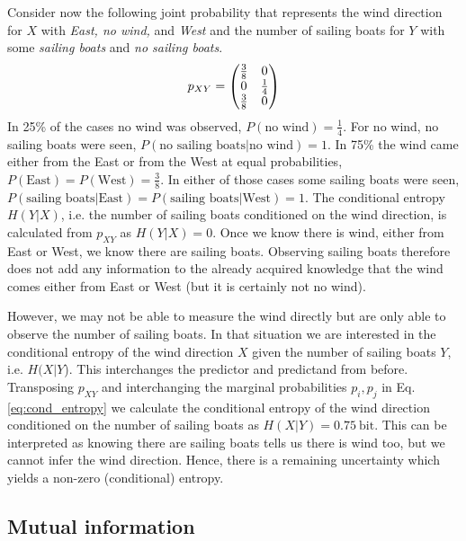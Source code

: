 Consider now the following joint probability that represents the wind direction for $X$ with \emph{East, no wind,} and \emph{West} and
the number of sailing boats for $Y$ with some \emph{sailing boats} and \emph{no sailing boats}.
\begin{equation}
	p_{XY} = \begin{pmatrix} \tfrac{3}{8} & 0 \\
				0 & \tfrac{1}{4} \\
				\tfrac{3}{8} & 0 \end{pmatrix}
\end{equation}
In 25\% of the cases no wind was observed, $P(\text{no wind}) = \tfrac{1}{4}$. For no wind, no sailing boats were seen,
$P(\text{no sailing boats} \vert \text{no wind}) = 1$. In 75\% the wind came either from the East or from the West at
equal probabilities, $P(\text{East}) = P(\text{West}) = \tfrac{3}{8}$. In either of those cases some sailing boats were seen,
$P(\text{sailing boats} \vert \text{East}) = P(\text{sailing boats} \vert \text{West}) =1$. The conditional entropy $H(Y \vert X)$,
i.e. the number of sailing boats conditioned on the wind direction, is calculated from $p_{XY}$ as $H(Y \vert X) = 0$. Once
we know there is wind, either from East or West, we know there are sailing boats. Observing sailing boats therefore does 
not add any information to the already acquired knowledge that the wind comes either from East or West (but it is certainly not
no wind).

However, we may not be able to measure the wind directly but are only able to observe the number of sailing boats.
In that situation we are interested in the conditional entropy of the wind direction $X$ given the number of sailing boats $Y$, i.e.
$H(X\vert Y$). This interchanges the predictor and predictand from before. Transposing $p_{XY}$ and interchanging the
marginal probabilities $p_i, p_j$ in Eq. \ref{eq:cond_entropy} we calculate the conditional entropy of the wind direction
conditioned on the number of sailing boats as $H(X\vert Y) = 0.75~\mathrm{bit}$.
This can be interpreted as knowing there are sailing boats tells us there is wind too, but we cannot infer the wind direction.
Hence, there is a remaining uncertainty which yields a non-zero (conditional) entropy.

\subsection{Mutual information}
\label{sec:mutual_information}

